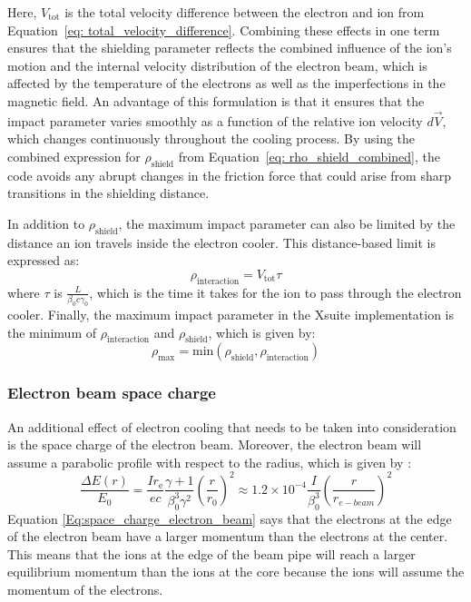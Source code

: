 %
Here, \( V_{\text{tot}} \) is the total velocity difference between the electron and ion from Equation~\ref{eq: total_velocity_difference}. Combining these effects in one term ensures that the shielding parameter reflects the combined influence of the ion’s motion and the internal velocity distribution of the electron beam, which is affected by the temperature of the electrons as well as the imperfections in the magnetic field.
%
An advantage of this formulation is that it ensures that the impact parameter varies smoothly as a function of the relative ion velocity \( d\vec{V} \), which changes continuously throughout the cooling process. By using the combined expression for \( \rho_{\text{shield}} \) from Equation~\eqref{eq: rho_shield_combined}, the code avoids any abrupt changes in the friction force that could arise from sharp transitions in the shielding distance.

In addition to \( \rho_{\text{shield}} \), the maximum impact parameter can also be limited by the distance an ion travels inside the electron cooler. This distance-based limit is expressed as:
%
\begin{equation}
\rho_{\text{interaction}} = V_{\text{tot}} \tau
\end{equation}
%
where \( \tau \) is \( \frac{L}{\beta_0 c \gamma_0} \), which is the time it takes for the ion to pass through the electron cooler.
%
Finally, the maximum impact parameter in the Xsuite implementation is the minimum of \( \rho_{\text{interaction}} \) and \( \rho_{\text{shield}} \), which is given by:
%
\begin{equation}
\rho_\text{max} = \text{min}(\rho_{\text{shield}}, \rho_{\text{interaction}})
\label{eq: max_impact_parameter}
\end{equation}
%
\subsubsection{Electron beam space charge}

An additional effect of electron cooling that needs to be taken into consideration is the space charge of the electron beam. Moreover, the electron beam will assume a parabolic profile with respect to the radius, which is given by \cite{poth1990electron}:
\begin{equation}
\frac{\Delta E(r)}{E_0}
=\frac{I r_{\mathrm{e}}}{e c} \frac{\gamma+1}{\beta_0^3 \gamma^2}\left(\frac{r}{r_0}\right)^2
\approx 1.2 \times 10^{-4} \frac{I}{\beta_0^3}\left(\frac{r}{r_{e-beam}}\right)^2
\label{Eq:space_charge_electron_beam}
\end{equation}
Equation \ref{Eq:space_charge_electron_beam} says that the electrons at the edge of the electron beam have a larger momentum than the electrons at the center. This means that the ions at the edge of the beam pipe will reach a larger equilibrium momentum than the ions at the core because the ions will assume the momentum of the electrons.

